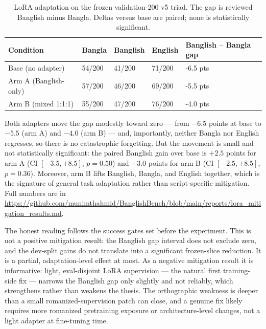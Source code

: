 \begin{table}[H]
\centering
\caption{LoRA adaptation on the frozen validation-200 v5 triad. The gap is reviewed Banglish minus Bangla. Deltas versus base are paired; none is statistically significant.}
\label{tab:lora}
\small
\begin{tabular}{lllll}
\hline
Condition & Bangla & Banglish & English & Banglish -- Bangla gap \\
\hline
Base (no adapter) & 54/200 & 41/200 & 71/200 & -6.5 pts \\
Arm A (Banglish-only) & 57/200 & 46/200 & 69/200 & -5.5 pts \\
Arm B (mixed 1:1:1) & 55/200 & 47/200 & 76/200 & -4.0 pts \\
\hline
\end{tabular}%
\end{table}

Both adapters move the gap modestly toward zero --- from $-6.5$ points at base to $-5.5$ (arm A) and $-4.0$ (arm B) --- and, importantly, neither Bangla nor English regresses, so there is no catastrophic forgetting. But the movement is small and not statistically significant: the paired Banglish gain over base is $+2.5$ points for arm A (CI $[-3.5, +8.5]$, $p = 0.50$) and $+3.0$ points for arm B (CI $[-2.5, +8.5]$, $p = 0.36$). Moreover, arm B lifts Banglish, Bangla, and English together, which is the signature of general task adaptation rather than script-specific mitigation. Full numbers are in \url{https://github.com/munimthahmid/BanglishBench/blob/main/reports/lora_mitigation_results.md}.

The honest reading follows the success gates set before the experiment. This is not a positive mitigation result: the Banglish gap interval does not exclude zero, and the dev-split gains do not translate into a significant frozen-slice reduction. It is a partial, adaptation-level effect at most. As a negative mitigation result it is informative: light, eval-disjoint LoRA supervision --- the natural first training-side fix --- narrows the Banglish gap only slightly and not reliably, which strengthens rather than weakens the thesis. The orthographic weakness is deeper than a small romanized-supervision patch can close, and a genuine fix likely requires more romanized pretraining exposure or architecture-level changes, not a light adapter at fine-tuning time.

\endinput
